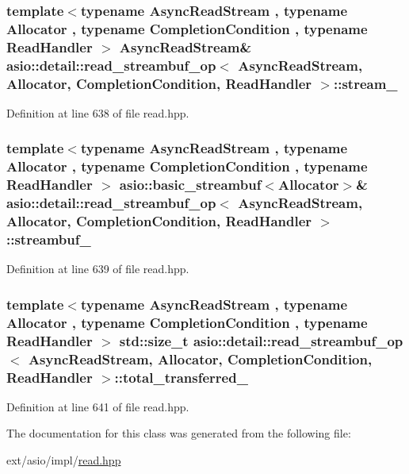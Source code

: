 \subsubsection[{stream\+\_\+}]{\setlength{\rightskip}{0pt plus 5cm}template$<$typename Async\+Read\+Stream , typename Allocator , typename Completion\+Condition , typename Read\+Handler $>$ Async\+Read\+Stream\& {\bf asio\+::detail\+::read\+\_\+streambuf\+\_\+op}$<$ Async\+Read\+Stream, Allocator, Completion\+Condition, Read\+Handler $>$\+::stream\+\_\+}\label{classasio_1_1detail_1_1read__streambuf__op_ae6b7af6cf5d34d6d6ad76b3840a3d786}


Definition at line 638 of file read.\+hpp.

\hypertarget{classasio_1_1detail_1_1read__streambuf__op_a254bfb01270d44ceaa9066e7a59c514e}{}
\subsubsection[{streambuf\+\_\+}]{\setlength{\rightskip}{0pt plus 5cm}template$<$typename Async\+Read\+Stream , typename Allocator , typename Completion\+Condition , typename Read\+Handler $>$ {\bf asio\+::basic\+\_\+streambuf}$<$Allocator$>$\& {\bf asio\+::detail\+::read\+\_\+streambuf\+\_\+op}$<$ Async\+Read\+Stream, Allocator, Completion\+Condition, Read\+Handler $>$\+::streambuf\+\_\+}\label{classasio_1_1detail_1_1read__streambuf__op_a254bfb01270d44ceaa9066e7a59c514e}


Definition at line 639 of file read.\+hpp.

\hypertarget{classasio_1_1detail_1_1read__streambuf__op_acfdc20ee2c0a53125cfda4269d23380b}{}
\subsubsection[{total\+\_\+transferred\+\_\+}]{\setlength{\rightskip}{0pt plus 5cm}template$<$typename Async\+Read\+Stream , typename Allocator , typename Completion\+Condition , typename Read\+Handler $>$ std\+::size\+\_\+t {\bf asio\+::detail\+::read\+\_\+streambuf\+\_\+op}$<$ Async\+Read\+Stream, Allocator, Completion\+Condition, Read\+Handler $>$\+::total\+\_\+transferred\+\_\+}\label{classasio_1_1detail_1_1read__streambuf__op_acfdc20ee2c0a53125cfda4269d23380b}


Definition at line 641 of file read.\+hpp.



The documentation for this class was generated from the following file\+:\begin{DoxyCompactItemize}
\item 
ext/asio/impl/\hyperlink{impl_2read_8hpp}{read.\+hpp}\end{DoxyCompactItemize}
